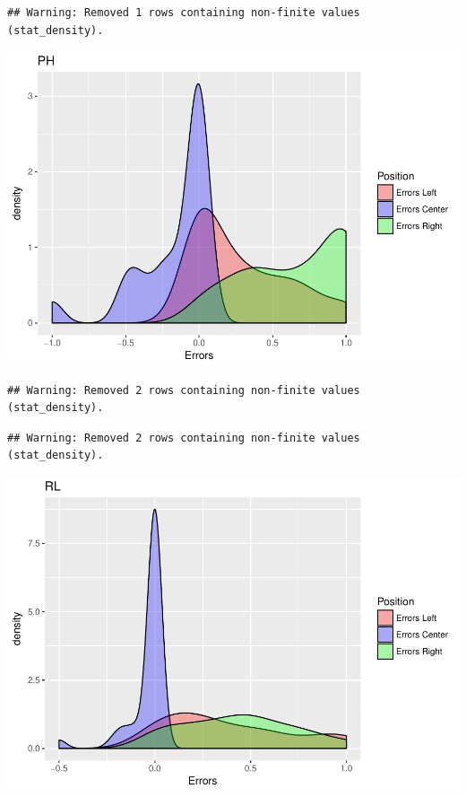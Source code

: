 \documentclass[]{article}
\begin{document}
\begin{verbatim}
## Warning: Removed 1 rows containing non-finite values (stat_density).
\end{verbatim}

\includegraphics{individual_analysis_report_files/figure-latex/unnamed-chunk-9-4.pdf}

\begin{verbatim}
## Warning: Removed 2 rows containing non-finite values (stat_density).
\end{verbatim}

\begin{verbatim}
## Warning: Removed 2 rows containing non-finite values (stat_density).
\end{verbatim}

\includegraphics{individual_analysis_report_files/figure-latex/unnamed-chunk-9-5.pdf}
\end{document}
